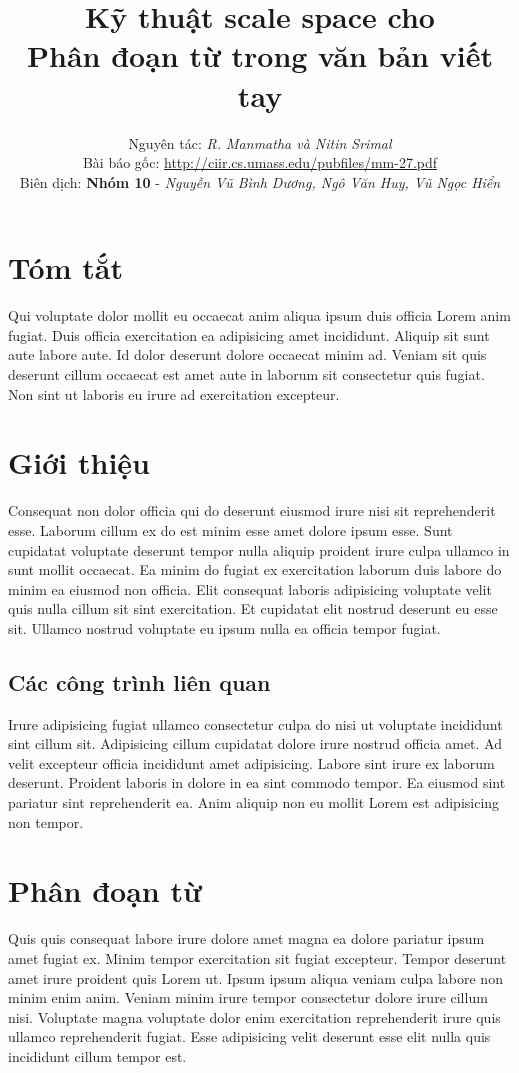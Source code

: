 \documentclass[a4paper]{article}
\title {
    Kỹ thuật scale space cho\\
    Phân đoạn từ trong văn bản viết tay
}
\author {
    Nguyên tác: \textit{R. Manmatha và Nitin Srimal}\\
    Bài báo gốc: \url{http://ciir.cs.umass.edu/pubfiles/mm-27.pdf}\\
    Biên dịch: \textbf{Nhóm 10} - \textit{Nguyễn Vũ Bình Dương, Ngô Văn Huy, Vũ Ngọc Hiển}
}
\begin{document}
\maketitle
\pagebreak

\tableofcontents
\pagebreak

\section*{Tóm tắt}
Qui voluptate dolor mollit eu occaecat anim aliqua ipsum duis officia Lorem anim fugiat. Duis officia exercitation ea adipisicing amet incididunt. Aliquip sit sunt aute labore aute. Id dolor deserunt dolore occaecat minim ad. Veniam sit quis deserunt cillum occaecat est amet aute in laborum sit consectetur quis fugiat. Non sint ut laboris eu irure ad exercitation excepteur.

\section{Giới thiệu}
Consequat non dolor officia qui do deserunt eiusmod irure nisi sit reprehenderit esse. Laborum cillum ex do est minim esse amet dolore ipsum esse. Sunt cupidatat voluptate deserunt tempor nulla aliquip proident irure culpa ullamco in sunt mollit occaecat. Ea minim do fugiat ex exercitation laborum duis labore do minim ea eiusmod non officia. Elit consequat laboris adipisicing voluptate velit quis nulla cillum sit sint exercitation. Et cupidatat elit nostrud deserunt eu esse sit. Ullamco nostrud voluptate eu ipsum nulla ea officia tempor fugiat.

\subsection{Các công trình liên quan}
Irure adipisicing fugiat ullamco consectetur culpa do nisi ut voluptate incididunt sint cillum sit. Adipisicing cillum cupidatat dolore irure nostrud officia amet. Ad velit excepteur officia incididunt amet adipisicing. Labore sint irure ex laborum deserunt. Proident laboris in dolore in ea sint commodo tempor. Ea eiusmod sint pariatur sint reprehenderit ea. Anim aliquip non eu mollit Lorem est adipisicing non tempor.

\section{Phân đoạn từ}
Quis quis consequat labore irure dolore amet magna ea dolore pariatur ipsum amet fugiat ex. Minim tempor exercitation sit fugiat excepteur. Tempor deserunt amet irure proident quis Lorem ut. Ipsum ipsum aliqua veniam culpa labore non minim enim anim. Veniam minim irure tempor consectetur dolore irure cillum nisi. Voluptate magna voluptate dolor enim exercitation reprehenderit irure quis ullamco reprehenderit fugiat. Esse adipisicing velit deserunt esse elit nulla quis incididunt cillum tempor est.
\end{document}
